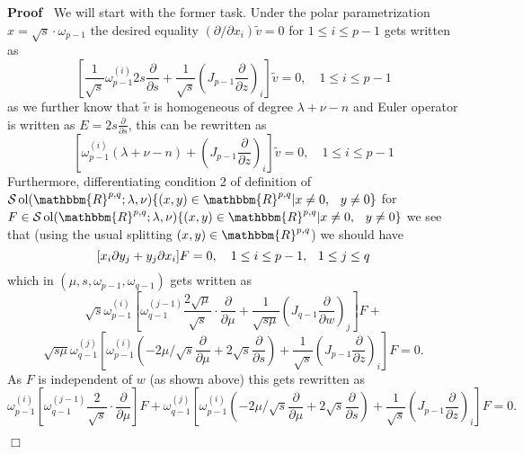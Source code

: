 \documentclass{article}
\newcommand{\tmop}[1]{\ensuremath{\operatorname{#1}}}
\renewenvironment{proof}{\noindent\textbf{Proof\ }}{\hspace*{\fill}$\Box$\medskip}
\theoremstyle{remark}
\newcommand{\R}{\mathbbm{R}}
\begin{document}
\begin{proof}
  We will start with the former task. Under the polar parametrization $x =
  \sqrt{s} \cdot \omega_{p - 1}$ the desired equality $(\partial / \partial
  x_i)  \tilde{v} = 0$ for $1 \leq i \leq p - 1$ gets written as
  \[ \left[ \frac{1}{\sqrt{s}} \omega_{p - 1}^{(i)} 2 s
     \frac{\partial}{\partial s} + \frac{1}{\sqrt{s}}  \left( J_{p - 1} 
     \frac{\partial}{\partial z} \right)_i \right]  \tilde{v} = 0, \quad 1
     \leq i \leq p - 1 \]
  as we further know that $\tilde{v}$ is homogeneous of degree $\lambda + \nu
  - n$ and Euler operator is written as $E = 2 s \frac{\partial}{\partial s}$,
  this can be rewritten as
  \begin{equation}
    \left[ \omega_{p - 1}^{(i)} (\lambda + \nu - n) + \left( J_{p - 1} 
    \frac{\partial}{\partial z} \right)_i \right]  \tilde{v} = 0, \quad 1 \leq
    i \leq p - 1 \label{eq:sing-q-dx}
  \end{equation}
  Furthermore, differentiating condition 2 of definition of $\mathcal{S}
  \tmop{ol} (\R^{p, q} ; \lambda, \nu)\{(x, y) \in \R^{p, q} |x \neq 0,
  \hspace{0.75em} y \neq 0\}$ for $F \in \mathcal{S} \tmop{ol} (\R^{p, q} ;
  \lambda, \nu)\{(x, y) \in \R^{p, q} |x \neq 0, \hspace{0.75em} y \neq 0\}$
  we see that (using the usual splitting $(x, y) \in \R^{p, q}$) we should
  have
  \[ [x_i \partial y_j + y_j \partial x_i] F = 0, \quad 1 \le i \le p - 1,
     \hspace{0.75em} 1 \leq j \leq q \]
  which in $(\mu, s, \omega_{p - 1}, \omega_{q - 1})$ gets written as
  \[ \sqrt{s} \omega^{(i)}_{p - 1}  \left[ \omega^{(j - 1)}_{q - 1}  \frac{2
     \sqrt{\mu}}{\sqrt{s}} \cdot \frac{\partial}{\partial \mu} +
     \frac{1}{\sqrt{s \mu}}  \left( J_{q - 1}  \frac{\partial}{\partial w}
     \right)_j \right] F + \]
  \[ \sqrt{s \mu} \omega^{(j)}_{q - 1}  \left[ \omega_{p - 1}^{(i)}  \left( -
     2 \mu / \sqrt{s}  \frac{\partial}{\partial \mu} + 2 \sqrt{s} 
     \frac{\partial}{\partial s} \right) + \frac{1}{\sqrt{s}}  \left( J_{p -
     1}  \frac{\partial}{\partial z} \right)_i \right] F = 0. \]
  As $F$ is independent of $w$ (as shown above) this gets rewritten as
  \[ \omega^{(i)}_{p - 1}  \left[ \omega^{(j - 1)}_{q - 1}  \frac{2}{\sqrt{s}}
     \cdot \frac{\partial}{\partial \mu} \right] F + \omega^{(j)}_{q - 1} 
     \left[ \omega_{p - 1}^{(i)}  \left( - 2 \mu / \sqrt{s} 
     \frac{\partial}{\partial \mu} + 2 \sqrt{s}  \frac{\partial}{\partial s}
     \right) + \frac{1}{\sqrt{s}}  \left( J_{p - 1}  \frac{\partial}{\partial
     z} \right)_i \right] F = 0. \]

\end{proof}
\end{document}
